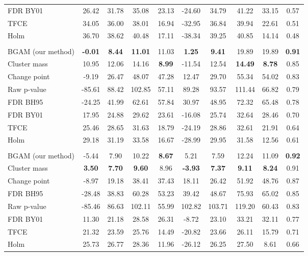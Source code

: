 \documentclass[
  doc,
  floatsintext,
  longtable,
  a4paper,
  nolmodern,
  notxfonts,
  notimes,
  colorlinks=true,linkcolor=blue,citecolor=blue,urlcolor=blue]{apa7}
\begin{document}
\begin{table}
\begin{tabular*}{\linewidth}{@{\extracolsep{\fill}}lccccccccc}
FDR BY01 & 26.42 & 31.78 & 35.08 & 23.13 & -24.60 & 34.79 & 41.22 & 33.15 & 0.57 \\ 
TFCE & 34.05 & 36.00 & 38.01 & 16.94 & -32.95 & 36.84 & 39.94 & 22.61 & 0.51 \\ 
Holm & 36.70 & 38.62 & 40.48 & 17.11 & -38.34 & 39.25 & 40.85 & 14.14 & 0.48 \\ 
\midrule\addlinespace[2.5pt]
\multicolumn{10}{l}{SNR = 1} \\[2.5pt] 
\midrule\addlinespace[2.5pt]
BGAM (our method) & {\bfseries -0.01} & {\bfseries 8.44} & {\bfseries 11.01} & 11.03 & {\bfseries 1.25} & {\bfseries 9.41} & 19.89 & 19.89 & {\bfseries 0.91} \\ 
Cluster mass & 10.95 & 12.06 & 14.16 & {\bfseries 8.99} & -11.54 & 12.54 & {\bfseries 14.49} & {\bfseries 8.78} & 0.85 \\ 
Change point & -9.19 & 26.47 & 48.07 & 47.28 & 12.47 & 29.70 & 55.34 & 54.02 & 0.83 \\ 
Raw p-value & -85.61 & 88.42 & 102.85 & 57.11 & 89.28 & 93.57 & 111.44 & 66.82 & 0.79 \\ 
FDR BH95 & -24.25 & 41.99 & 62.61 & 57.84 & 30.97 & 48.95 & 72.32 & 65.48 & 0.78 \\ 
FDR BY01 & 17.95 & 24.88 & 29.62 & 23.61 & -16.08 & 25.74 & 32.64 & 28.46 & 0.70 \\ 
TFCE & 25.46 & 28.65 & 31.63 & 18.79 & -24.19 & 28.86 & 32.61 & 21.91 & 0.64 \\ 
Holm & 29.18 & 31.19 & 33.58 & 16.67 & -28.99 & 29.95 & 31.58 & 12.56 & 0.61 \\ 
\midrule\addlinespace[2.5pt]
\multicolumn{10}{l}{SNR = 2} \\[2.5pt] 
\midrule\addlinespace[2.5pt]
BGAM (our method) & -5.44 & 7.90 & 10.22 & {\bfseries 8.67} & 5.21 & 7.59 & 12.24 & 11.09 & {\bfseries 0.92} \\ 
Cluster mass & {\bfseries 3.50} & {\bfseries 7.70} & {\bfseries 9.60} & 8.96 & {\bfseries -3.93} & {\bfseries 7.37} & {\bfseries 9.11} & {\bfseries 8.24} & 0.91 \\ 
Change point & -8.97 & 19.18 & 38.41 & 37.43 & 18.11 & 26.42 & 51.92 & 48.76 & 0.87 \\ 
FDR BH95 & -28.48 & 38.83 & 60.28 & 53.23 & 39.42 & 48.67 & 75.93 & 65.02 & 0.85 \\ 
Raw p-value & -85.46 & 86.63 & 102.11 & 55.99 & 102.82 & 103.71 & 119.20 & 60.43 & 0.83 \\ 
FDR BY01 & 11.30 & 21.18 & 28.58 & 26.31 & -8.72 & 23.10 & 33.21 & 32.11 & 0.77 \\ 
TFCE & 21.32 & 23.59 & 25.76 & 14.49 & -20.82 & 23.66 & 26.11 & 15.79 & 0.71 \\ 
Holm & 25.73 & 26.77 & 28.36 & 11.96 & -26.12 & 26.25 & 27.50 & 8.61 & 0.66 \\ 
\bottomrule
\end{tabular*}

\end{table}
\end{document}
